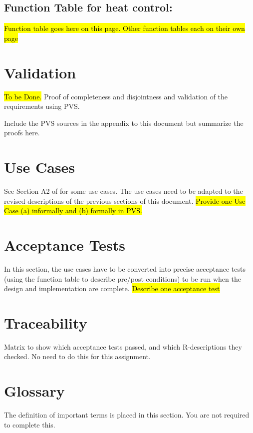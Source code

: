 \documentclass[fontsize=12pt,paper=letter,twoside]{scrartcl}
\begin{document}
\newpage
\subsection{Function Table for heat control: }

\hl{Function table goes here on this page. Other function tables each on their own page}

\newpage
\section{Validation}
\hl{To be Done.} 
Proof of completeness and disjointness and validation of the requirements using PVS.

Include the PVS sources in the appendix to this document but summarize the proofs here.

\newpage
\section{Use Cases}

See Section A2 of \cite{REMH} for some use cases. The use cases need to be adapted to the revised descriptions of the previous sections of this document.
\hl{Provide one Use Case (a) informally and (b) formally in PVS.}

\newpage
\section{Acceptance Tests}

In this section, the use cases have to be converted into precise acceptance tests (using the function table to describe pre/post conditions) to be run when the design and implementation are complete. \hl{Describe one acceptance test}

\newpage
\section{Traceability}

Matrix to show which acceptance tests passed, and which R-descriptions they checked. No need to do this for this assignment. 


\section{Glossary}

The definition of important terms is placed in this section. You are not required to complete this.


\end{document}
